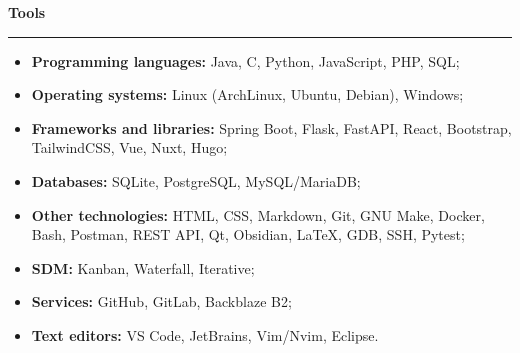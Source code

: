 {\vspace{0.5cm} \hspace{-0.5cm} \Large \textbf{Tools}}
\par\noindent\rule{\textwidth}{0.1mm}

\begin{itemize}
    \item \textbf{Programming languages:} Java, C, Python, JavaScript, PHP, SQL;
    \item \textbf{Operating systems:} Linux (ArchLinux, Ubuntu, Debian), Windows;
    \item \textbf{Frameworks and libraries:} Spring Boot, Flask, FastAPI, React, Bootstrap, TailwindCSS, Vue, Nuxt, Hugo;
    \item \textbf{Databases:} SQLite, PostgreSQL, MySQL/MariaDB;
    \item \textbf{Other technologies:} HTML, CSS, Markdown, Git, GNU Make, Docker, Bash, Postman,
        REST API, Qt, Obsidian, \LaTeX, GDB, SSH, Pytest;
    \item \textbf{SDM:} Kanban, Waterfall, Iterative;
    \item \textbf{Services:} GitHub, GitLab, Backblaze B2; 
    \item \textbf{Text editors:} VS Code, JetBrains, Vim/Nvim, Eclipse.
\end{itemize}
